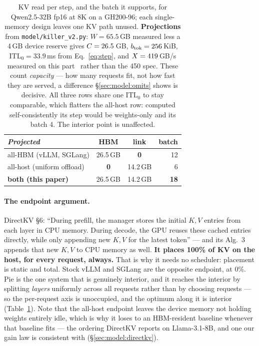 \begin{table}[t]
\centering
\small
\begin{tabular}{lccr}
\toprule
\emph{Projected} & HBM & link & batch \\
\midrule
all-HBM (vLLM, SGLang)     & 26.5\,GB      & \textbf{0}    & 12 \\
all-host (uniform offload) & \textbf{0}    & 14.2\,GB      & 6 \\
\textbf{both (this paper)} & 26.5\,GB      & 14.2\,GB      & \textbf{18} \\
\bottomrule
\end{tabular}
\caption{KV read per step, and the batch it supports, for Qwen2.5-32B fp16 at 8K
on a GH200-96; each single-memory design leaves one KV path unused.
\textbf{Projections} from \texttt{model/killer\_v2.py}: $W = 65.5$\,GB measured
less a 4\,GB device reserve gives $C = 26.5$\,GB, $b_{\mathrm{tok}} = 256$\,KiB,
$\mathrm{ITL}_0 = 33.9$\,ms from Eq.~\ref{eq:step}, and $X = 419$\,GB/s
measured on this part~\cite{pie} rather than the 450 spec. These count
\emph{capacity} --- how many requests fit, not how fast they are served, a
difference \S\ref{sec:model:omits} shows is decisive. All three rows share one
$\mathrm{ITL}_0$ to stay comparable, which flatters the all-host row: computed
self-consistently its step would be weights-only and its batch 4. The interior
point is unaffected.}
\label{tab:endpoints}
\end{table}

\paragraph{The endpoint argument.} DirectKV \S6: ``During prefill, the manager
stores the initial $K,V$ entries from each layer in CPU memory. During decode,
the GPU reuses these cached entries directly, while only appending new $K,V$
for the latest token'' --- and its Alg.~3 appends that new $K,V$ to CPU memory
as well. \textbf{It places 100\% of KV on the host, for every request, always.}
That is why it needs no scheduler: placement is static and total. Stock vLLM
and SGLang are the opposite endpoint, at 0\%. Pie is the one system that is
genuinely interior, and it reaches the interior by splitting \emph{layers}
uniformly across all requests rather than by choosing requests --- so the
per-request axis is unoccupied, and the optimum along it is interior
(Table~\ref{tab:endpoints}). Note that the all-host endpoint leaves the device
memory not holding weights entirely idle, which is why it loses to an
HBM-resident baseline whenever that baseline fits --- the ordering DirectKV
reports on Llama-3.1-8B, and one our gain law is consistent with
(\S\ref{sec:model:directkv}).

